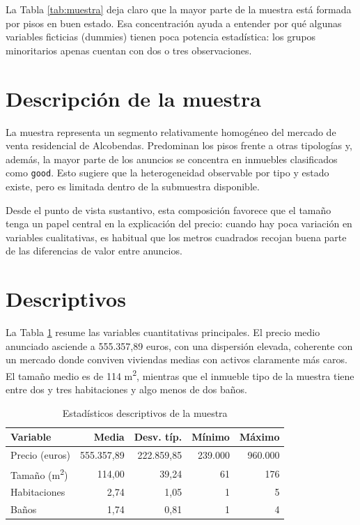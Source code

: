 \documentclass[11pt,a4paper]{article}
\begin{document}
La Tabla \ref{tab:muestra} deja claro que la mayor parte de la muestra está formada por pisos en buen estado. Esa concentración ayuda a entender por qué algunas variables ficticias (dummies) tienen poca potencia estadística: los grupos minoritarios apenas cuentan con dos o tres observaciones.

\section{Descripción de la muestra}

La muestra representa un segmento relativamente homogéneo del mercado de venta residencial de Alcobendas. Predominan los pisos frente a otras tipologías y, además, la mayor parte de los anuncios se concentra en inmuebles clasificados como \texttt{good}. Esto sugiere que la heterogeneidad observable por tipo y estado existe, pero es limitada dentro de la submuestra disponible.

Desde el punto de vista sustantivo, esta composición favorece que el tamaño tenga un papel central en la explicación del precio: cuando hay poca variación en variables cualitativas, es habitual que los metros cuadrados recojan buena parte de las diferencias de valor entre anuncios.

\section{Descriptivos}

La Tabla \ref{tab:descriptivos} resume las variables cuantitativas principales. El precio medio anunciado asciende a 555.357,89 euros, con una dispersión elevada, coherente con un mercado donde conviven viviendas medias con activos claramente más caros. El tamaño medio es de 114 m\textsuperscript{2}, mientras que el inmueble tipo de la muestra tiene entre dos y tres habitaciones y algo menos de dos baños.

\begin{table}[H]
\centering
\caption{Estadísticos descriptivos de la muestra}
\label{tab:descriptivos}
\small
{}
\begin{tabular}{lrrrr}
\toprule
\rowcolor{tablehead}
Variable & Media & Desv. típ. & Mínimo & Máximo \\
\midrule
Precio (euros) & 555.357,89 & 222.859,85 & 239.000 & 960.000 \\
Tamaño (m\textsuperscript{2}) & 114,00 & 39,24 & 61 & 176 \\
Habitaciones & 2,74 & 1,05 & 1 & 5 \\
Baños & 1,74 & 0,81 & 1 & 4 \\
\bottomrule
\end{tabular}
\end{table}
\end{document}
